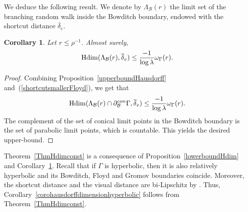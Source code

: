 \documentclass{amsart}
\newtheorem{cor}[thm]{Corollary}
\theoremstyle{definition}
\theoremstyle{remark}
\newcommand{\Hdim}{{\rm Hdim}}
\begin{document}
We deduce the following result.
We denote by $\Lambda_\mathcal{B}(r)$ the limit set of the branching random walk inside the Bowditch boundary, endowed with the shortcut distance $\overline{\delta}_e$.
\begin{cor}\label{coroupperboundHausdorff}
Let $r\leq \rho^{-1}$.
Almost surely,
$$\Hdim(\Lambda_\mathcal{B}(r),\overline{\delta}_e)\leq \frac{-1}{\log \lambda}\omega_{\Gamma}(r).$$
\end{cor}

\begin{proof}
Combining Proposition~\ref{upperboundHausdorff} and~(\ref{shortcutsmallerFloyd}), we get that
$$\Hdim(\Lambda_\mathcal{B}(r)\cap \partial^{con}_{\mathcal{B}}\Gamma,\overline{\delta}_e)\leq \frac{-1}{\log \lambda}\omega_{\Gamma}(r).$$
The complement of the set of conical limit points in the Bowditch boundary is the set of parabolic limit points, which is countable.
This yields the desired upper-bound.
\end{proof}
Theorem~\ref{ThmHdimconst} is a consequence of Proposition~\ref{lowerboundHdim} and Corollary~\ref{coroupperboundHausdorff}.
Recall that if $\Gamma$ is hyperbolic, then it is also relatively hyperbolic and its Bowditch, Floyd and Gromov boundaries coincide.
Moreover, the shortcut distance and the visual distance are bi-Lipschitz by \cite[Proposition~6.1]{PY}.
Thus, Corollary~\ref{corohausdorffdimensionhyperbolic} follows from Theorem~\ref{ThmHdimconst}.

\end{document}

